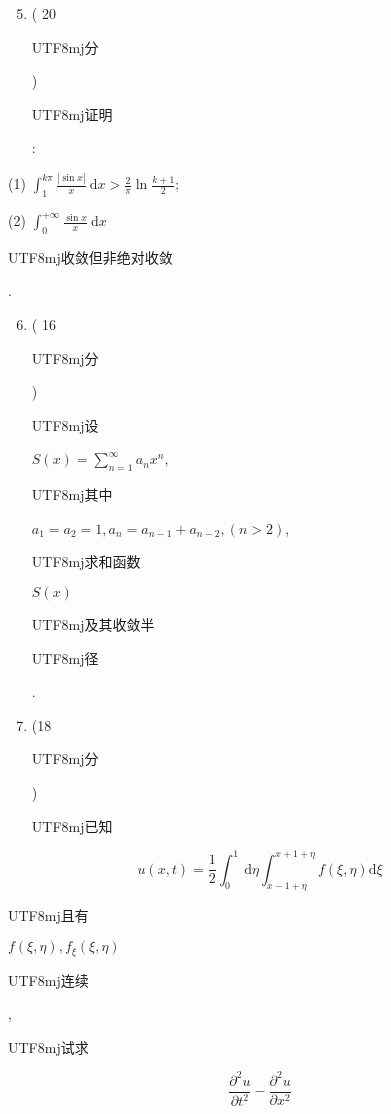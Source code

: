 \documentclass[10pt]{article}
\begin{document}
\begin{enumerate}
  \setcounter{enumi}{4}
  \item ( 20 \begin{CJK}{UTF8}{mj}分\end{CJK}) \begin{CJK}{UTF8}{mj}证明\end{CJK}:
\end{enumerate}
(1) $\int_{1}^{k \pi} \frac{|\sin x|}{x} \mathrm{~d} x>\frac{2}{\pi} \ln \frac{k+1}{2}$;

(2) $\int_{0}^{+\infty} \frac{\sin x}{x} \mathrm{~d} x$ \begin{CJK}{UTF8}{mj}收敛但非绝对收敛\end{CJK}.

\begin{enumerate}
  \setcounter{enumi}{5}
  \item ( 16 \begin{CJK}{UTF8}{mj}分\end{CJK}) \begin{CJK}{UTF8}{mj}设\end{CJK} $S(x)=\sum_{n=1}^{\infty} a_{n} x^{n}$, \begin{CJK}{UTF8}{mj}其中\end{CJK} $a_{1}=a_{2}=1, a_{n}=a_{n-1}+a_{n-2},(n>2)$, \begin{CJK}{UTF8}{mj}求和函数\end{CJK} $S(x)$ \begin{CJK}{UTF8}{mj}及其收敛半\end{CJK} \begin{CJK}{UTF8}{mj}径\end{CJK}.

  \item (18 \begin{CJK}{UTF8}{mj}分\end{CJK}) \begin{CJK}{UTF8}{mj}已知\end{CJK}

\end{enumerate}
$$
u(x, t)=\frac{1}{2} \int_{0}^{1} \mathrm{~d} \eta \int_{x-1+\eta}^{x+1+\eta} f(\xi, \eta) \mathrm{d} \xi
$$
\begin{CJK}{UTF8}{mj}且有\end{CJK} $f(\xi, \eta), f_{\xi}(\xi, \eta)$ \begin{CJK}{UTF8}{mj}连续\end{CJK}, \begin{CJK}{UTF8}{mj}试求\end{CJK}
$$
\frac{\partial^{2} u}{\partial t^{2}}-\frac{\partial^{2} u}{\partial x^{2}}
$$
\end{document}
